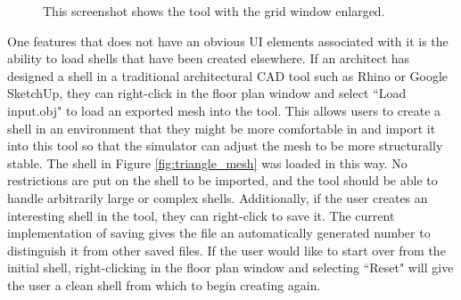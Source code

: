 \documentclass{thesis}
\begin{document}
\begin{figure}
\caption[Zoomed in grid]{This screenshot shows the tool with the grid window enlarged.}
\label{fig:big_grid}
\end{figure}

One features that does not have an obvious UI elements associated with it is the ability to load shells that have been created
elsewhere.  If an architect has designed a shell in a traditional architectural CAD tool such as Rhino\cite{rhino} or Google
SketchUp\cite{sketchup}, they can right-click in the floor plan window and select ``Load input.obj" to load an exported mesh
into the tool.  This allows users
to create a shell in an environment that they might be more comfortable in and import it into this tool so that the simulator
can adjust the mesh to be more structurally stable.  The shell in Figure \ref{fig:triangle_mesh} was loaded in this way.  No
restrictions are put on the shell to be imported, and the tool should be able to handle arbitrarily large or complex shells.
Additionally, if the user creates an interesting shell in the tool, they can right-click to save it.  The current implementation
of saving gives the file an automatically generated number to distinguish it from other saved files.  If the user would like to
start over from the initial shell, right-clicking in the floor plan window and selecting ``Reset" will give the user a clean shell
from which to begin creating again.
\end{document}
